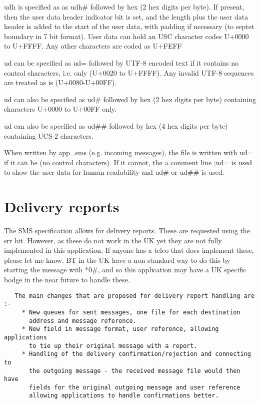    udh is specified as as udh\# followed by hex (2 hex digits per byte).
   If present, then the user data header indicator bit is set, and the
   length plus the user data header is added to the start of the user
   data, with padding if necessary (to septet boundary in 7 bit format).
   User data can hold an USC character codes U+0000 to U+FFFF. Any other
   characters are coded as U+FEFF

   ud can be specified as ud= followed by UTF-8 encoded text if it
   contains no control characters, i.e. only (U+0020 to U+FFFF). Any
   invalid UTF-8 sequences are treated as is (U+0080-U+00FF).

   ud can also be specified as ud\# followed by hex (2 hex digits per
   byte) containing characters U+0000 to U+00FF only.

   ud can also be specified as ud\#\# followed by hex (4 hex digits per
   byte) containing UCS-2 characters.

   When written by app\_sms (e.g. incoming messages), the file is written
   with ud= if it can be (no control characters). If it cannot, the a
   comment line ;ud= is used to show the user data for human readability
   and ud\# or ud\#\# is used.

\section{Delivery reports}

   The SMS specification allows for delivery reports. These are requested
   using the srr bit. However, as these do not work in the UK yet they
   are not fully implemented in this application. If anyone has a telco
   that does implement these, please let me know. BT in the UK have a non
   standard way to do this by starting the message with *0\#, and so this
   application may have a UK specific bodge in the near future to handle
   these.
\begin{verbatim}
   The main changes that are proposed for delivery report handling are :-
     * New queues for sent messages, one file for each destination
       address and message reference.
     * New field in message format, user reference, allowing applications
       to tie up their original message with a report.
     * Handling of the delivery confirmation/rejection and connecting to
       the outgoing message - the received message file would then have
       fields for the original outgoing message and user reference
       allowing applications to handle confirmations better.
\end{verbatim}
